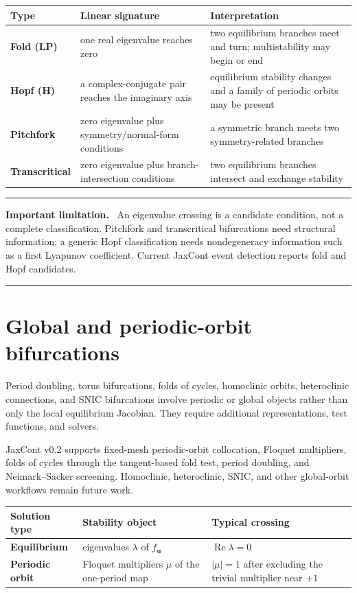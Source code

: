 \documentclass[11pt,oneside]{book}
\newcommand{\state}{\bm{u}}
\newenvironment{warningbox}
  {\par\medskip\noindent\begin{minipage}{\textwidth}
   \color{JaxRed}\rule{\textwidth}{0.8pt}\par
   \textbf{Important limitation.}\ \color{black}}
  {\par\color{JaxRed}\rule{\textwidth}{0.8pt}
   \end{minipage}\par\medskip}
\begin{document}
\begin{tabularx}{\textwidth}{>{\bfseries}p{}p{}X}
\toprule
Type & Linear signature & Interpretation\\
\midrule
Fold (LP) & one real eigenvalue reaches zero & two equilibrium branches meet
and turn; multistability may begin or end\\
Hopf (H) & a complex-conjugate pair reaches the imaginary axis & equilibrium
stability changes and a family of periodic orbits may be present\\
Pitchfork & zero eigenvalue plus symmetry/normal-form conditions & a symmetric
branch meets two symmetry-related branches\\
Transcritical & zero eigenvalue plus branch-intersection conditions & two
equilibrium branches intersect and exchange stability\\
\bottomrule
\end{tabularx}

\begin{warningbox}
An eigenvalue crossing is a candidate condition, not a complete classification.
Pitchfork and transcritical bifurcations need structural information; a generic
Hopf classification needs nondegeneracy information such as a first Lyapunov
coefficient. Current JaxCont event detection reports fold and Hopf candidates.
\end{warningbox}

\section{Global and periodic-orbit bifurcations}

Period doubling, torus bifurcations, folds of cycles, homoclinic orbits,
heteroclinic connections, and SNIC bifurcations involve periodic or global
objects rather than only the local equilibrium Jacobian. They require
additional representations, test functions, and solvers.

JaxCont v0.2 supports fixed-mesh periodic-orbit collocation, Floquet
multipliers, folds of cycles through the tangent-based fold test, period
doubling, and Neimark--Sacker screening. Homoclinic, heteroclinic, SNIC, and
other global-orbit workflows remain future work.

\noindent\begin{tabularx}{\textwidth}{>{\bfseries}p{}p{}X}
\toprule
Solution type & Stability object & Typical crossing\\
\midrule
Equilibrium & eigenvalues $\lambda$ of $f_{\state}$ &
$\operatorname{Re}\lambda=0$\\
Periodic orbit & Floquet multipliers $\mu$ of the one-period map &
$|\mu|=1$ after excluding the trivial multiplier near $+1$\\
\bottomrule
\end{tabularx}
\end{document}
